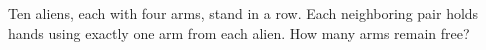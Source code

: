 Ten aliens, each with four arms, stand in a row. Each neighboring pair holds hands using exactly one arm from each alien. How many arms remain free?
